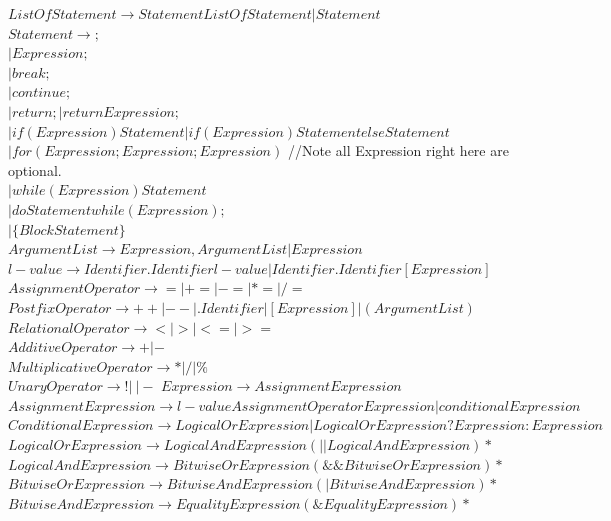 \documentclass{article}
\begin{document}
    $ListOfStatement \rightarrow Statement ListOfStatement | Statement$ \\
    $Statement \rightarrow ;$\\
    $| Expression ;$\\
    $| break ;$\\
    $| continue ;$\\
    $| return ; | return Expression ;$\\
    $| if ( Expression ) Statement | if ( Expression ) Statement else Statement$\\
    $| for ( Expression ; Expression ; Expression )$ //Note all Expression right here are optional.\\
    $| while ( Expression ) Statement$\\
    $| do Statement while ( Expression ) ;$\\
    $| \{ BlockStatement \}$\\
    $ArgumentList \rightarrow Expression , ArgumentList | Expression$\\
    $l-value \rightarrow Identifier . Identifier l-value | Identifier . Identifier [ Expression ]$\\
    $AssignmentOperator \rightarrow = | += | -= | *= | /=$\\
    $PostfixOperator \rightarrow ++ | -- | . Identifier | [ Expression ] | ( ArgumentList )$\\
    $RelationalOperator \rightarrow < | > | <= | >=$\\
    $AdditiveOperator \rightarrow + | -$\\
    $MultiplicativeOperator \rightarrow * | / | \%$\\
    $UnaryOperator \rightarrow ! | ~ | -$
    $Expression \rightarrow AssignmentExpression$\\
    $AssignmentExpression \rightarrow l-value AssignmentOperator Expression | conditionalExpression$\\
    $ConditionalExpression \rightarrow LogicalOrExpression | LogicalOrExpression ? Expression : Expression$\\
    $LogicalOrExpression \rightarrow LogicalAndExpression (|| LogicalAndExpression)*$ \\
    $LogicalAndExpression \rightarrow BitwiseOrExpression (\&\& BitwiseOrExpression)*$\\
    $BitwiseOrExpression \rightarrow BitwiseAndExpression (| BitwiseAndExpression)*$\\
    $BitwiseAndExpression \rightarrow EqualityExpression (\& EqualityExpression)*$\\
\end{document}
